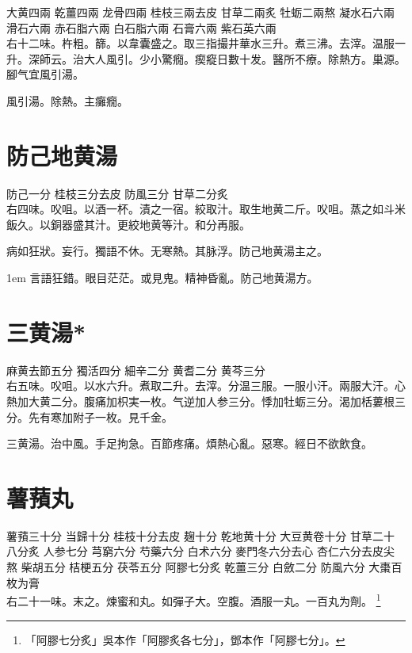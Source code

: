 大黄{\scriptsize 四兩} 乾薑{\scriptsize 四兩} 龙骨{\scriptsize 四兩} 桂枝{\scriptsize 三兩去皮} 甘草{二兩炙} 牡蛎{\scriptsize 二兩熬} 凝水石{\scriptsize 六兩} 滑石{\scriptsize 六兩} 赤石脂{\scriptsize 六兩} 白石脂{\scriptsize 六兩} 石膏{\scriptsize 六兩} 紫石英{\scriptsize 六兩}\\
右十二味。杵粗。篩。以韋囊盛之。取三指撮井華水三升。煮三沸。去滓。温服一升。{\scriptsize 深師云。治大人風引。少小驚癇。瘈瘲日數十发。醫所不療。除熱方。巢源。腳气宜風引湯。}

風引湯。除熱{\khaaitp 。主}癱癇。

\section{防己地黄湯}

防己{\scriptsize 一分} 桂枝{\scriptsize 三分去皮} 防風{\scriptsize 三分} 甘草{\scriptsize 二分炙}\\
右四味。㕮咀。以酒一杯。漬之一宿。絞取汁。取生地黄二斤。㕮咀。蒸之如斗米飯久。以銅器盛其汁。更絞地黄等汁。和分再服。

病如狂狀。妄行。獨語不休。无寒熱。其脉浮。防己地黄湯主之。

\hangindent 1em
言語狂錯。眼目茫茫。或見鬼。精神昏亂。防己地黄湯方。{\qianjin}

\section{三黄湯*}

麻黄{\scriptsize 去節五分} 獨活{\scriptsize 四分} 細辛{\scriptsize 二分} 黄耆{\scriptsize 二分} 黄芩{\scriptsize 三分}\\
右五味。㕮咀。以水六升。煮取二升。去滓。分温三服。一服小汗。兩服大汗。心熱加大黄二分。腹痛加枳実一枚。气逆加人参三分。悸加牡蛎三分。渴加栝蔞根三分。先有寒加附子一枚。{\scriptsize 見千金。}

三黄湯。治中風。手足拘急。百節疼痛。煩熱心亂。惡寒。經日不欲飲食。

\section{薯蕷丸}

薯蕷{\scriptsize 三十分} 当歸{\scriptsize 十分} 桂枝{\scriptsize 十分去皮} 麹{\scriptsize 十分} 乾地黄{\scriptsize 十分} 大豆黄卷{\scriptsize 十分} 甘草{\scriptsize 二十八分炙} 人参{\scriptsize 七分} 芎窮{\scriptsize 六分} 芍藥{\scriptsize 六分} 白术{\scriptsize 六分} 麥門冬{\scriptsize 六分去心} 杏仁{\scriptsize 六分去皮尖熬} 柴胡{\scriptsize 五分} 桔梗{\scriptsize 五分} 茯苓{\scriptsize 五分} 阿膠{\scriptsize 七分炙} 乾薑{\scriptsize 三分} 白斂{\scriptsize 二分} 防風{\scriptsize 六分} 大棗{\scriptsize 百枚为膏}\\
右二十一味。末之。煉蜜和丸。如彈子大。空腹。酒服一丸。一百丸为劑。
	\footnote{
		「阿膠七分炙」吳本作「阿膠炙各七分」，鄧本作「阿膠七分」。
	}

